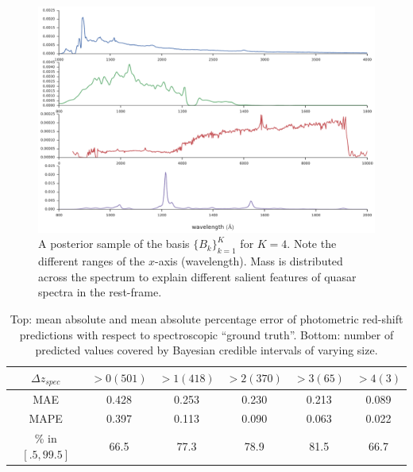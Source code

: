 \documentclass{article}
\begin{document}
\begin{figure}[t]
\vskip 0.2in
\begin{center}
\centerline{\includegraphics[width=2\columnwidth]{../figs/basis_samp_K_4}}
\vskip -0.2in
\caption{A posterior sample of the basis $\{ B_k \}_{k=1}^K$ for $K=4$.  Note the different ranges of the $x$-axis (wavelength).  Mass is distributed across the spectrum to explain different salient features of quasar spectra in the rest-frame. }
\label{fig:basis}
\end{center}
\end{figure}

\begin{table}[ht]
\caption{Top: mean absolute and mean absolute percentage error of photometric red-shift predictions with respect to spectroscopic ``ground truth''.  Bottom: number of predicted values covered by Bayesian credible intervals of varying size. }
\label{sample-table}
\vskip 0.15in
\begin{center}
\begin{small}
\begin{sc}
\begin{tabular*}{0.75\textwidth}{cccccc}
\hline
\abovespace\belowspace
  $\Delta z_{spec}$ &  $ > 0 (501)$ & $ > 1 (418)$ & $ > 2 (370)$ & $ > 3 (65)$ & $ > 4 (3)$ \\
\hline
\abovespace
MAE &  0.428 & 0.253 & 0.230 & 0.213 & 0.089 \\
MAPE &  0.397 & 0.113 & 0.090 & 0.063 & 0.022 \\
\hline
\% in $[.5, 99.5]$ &  66.5 & 77.3 & 78.9 & 81.5 & 66.7 \\
\hline
\end{tabular*}
\end{sc}
\end{small}
\end{center}
\vskip -0.1in
\end{table}
\end{document}
